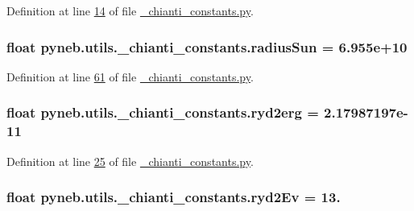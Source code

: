 Definition at line \hyperlink{__chianti__constants_8py_source_l00014}{14} of file \hyperlink{__chianti__constants_8py_source}{\+\_\+chianti\+\_\+constants.\+py}.

\hypertarget{namespacepyneb_1_1utils_1_1__chianti__constants_a0be81c3c0c21d1da41888ce98b5d6d1f}{}
\subsubsection[{radius\+Sun}]{\setlength{\rightskip}{0pt plus 5cm}float pyneb.\+utils.\+\_\+chianti\+\_\+constants.\+radius\+Sun = 6.\+955e+10}\label{namespacepyneb_1_1utils_1_1__chianti__constants_a0be81c3c0c21d1da41888ce98b5d6d1f}


Definition at line \hyperlink{__chianti__constants_8py_source_l00061}{61} of file \hyperlink{__chianti__constants_8py_source}{\+\_\+chianti\+\_\+constants.\+py}.

\hypertarget{namespacepyneb_1_1utils_1_1__chianti__constants_ad7625b518e82737e16e875fefc1d7946}{}
\subsubsection[{ryd2erg}]{\setlength{\rightskip}{0pt plus 5cm}float pyneb.\+utils.\+\_\+chianti\+\_\+constants.\+ryd2erg = 2.\+17987197e-\/11}\label{namespacepyneb_1_1utils_1_1__chianti__constants_ad7625b518e82737e16e875fefc1d7946}


Definition at line \hyperlink{__chianti__constants_8py_source_l00025}{25} of file \hyperlink{__chianti__constants_8py_source}{\+\_\+chianti\+\_\+constants.\+py}.

\hypertarget{namespacepyneb_1_1utils_1_1__chianti__constants_a32597fdc8de3dac5d1876cfab6a3dbd1}{}
\subsubsection[{ryd2\+Ev}]{\setlength{\rightskip}{0pt plus 5cm}float pyneb.\+utils.\+\_\+chianti\+\_\+constants.\+ryd2\+Ev = 13.}\label{namespacepyneb_1_1utils_1_1__chianti__constants_a32597fdc8de3dac5d1876cfab6a3dbd1}


